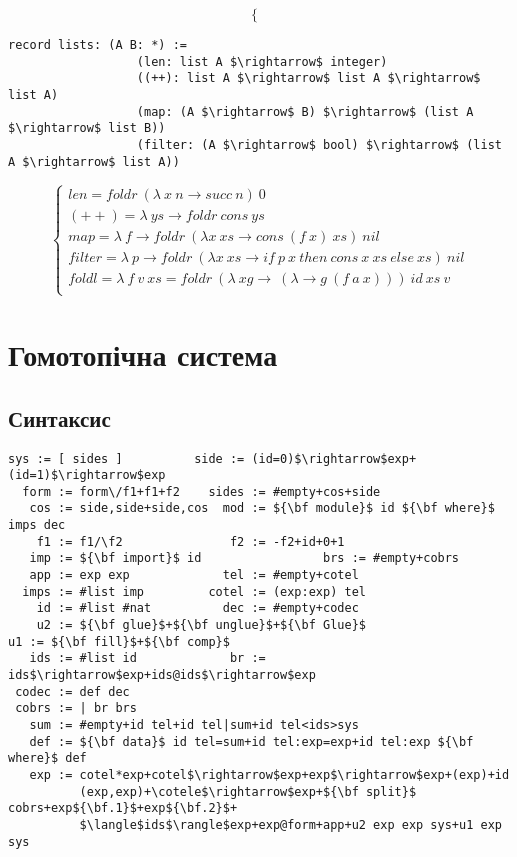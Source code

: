 \begin{definition}
\begin{definition}
\begin{definition}
\begin{definition}
$$\begin{cases}
\end{cases}
$$
\begin{lstlisting}[mathescape=true]
           record lists: (A B: *) :=
                  (len: list A $\rightarrow$ integer)
                  ((++): list A $\rightarrow$ list A $\rightarrow$ list A)
                  (map: (A $\rightarrow$ B) $\rightarrow$ (list A $\rightarrow$ list B))
                  (filter: (A $\rightarrow$ bool) $\rightarrow$ (list A $\rightarrow$ list A))
\end{lstlisting}
$$
\begin{cases}
len = foldr\ (\lambda\ x\ n \rightarrow succ\ n)\ 0\\
(++) = \lambda\ ys \rightarrow foldr\ cons\ ys\\
map = \lambda\ f \rightarrow foldr\ (\lambda x\ xs \rightarrow cons\ (f\ x)\ xs)\ nil\\
filter = \lambda\ p \rightarrow foldr\ (\lambda x\ xs \rightarrow if\ p\ x\ then\ cons\ x\ xs\ else\ xs)\ nil\\
foldl = \lambda\ f\ v\ xs = foldr\ (\lambda\ xg\rightarrow\ (\lambda \rightarrow g\ (f\ a\ x)))\ id\ xs\ v\\
\end{cases}
$$

\newpage
\section{Гомотопічна система}

\subsection{Синтаксис}


\begin{lstlisting}[mathescape=true]
   sys := [ sides ]          side := (id=0)$\rightarrow$exp+(id=1)$\rightarrow$exp
  form := form\/f1+f1+f2    sides := #empty+cos+side
   cos := side,side+side,cos  mod := ${\bf module}$ id ${\bf where}$ imps dec
    f1 := f1/\f2               f2 := -f2+id+0+1
   imp := ${\bf import}$ id                 brs := #empty+cobrs
   app := exp exp             tel := #empty+cotel
  imps := #list imp         cotel := (exp:exp) tel
    id := #list #nat          dec := #empty+codec
    u2 := ${\bf glue}$+${\bf unglue}$+${\bf Glue}$                   u1 := ${\bf fill}$+${\bf comp}$
   ids := #list id             br := ids$\rightarrow$exp+ids@ids$\rightarrow$exp
 codec := def dec
 cobrs := | br brs
   sum := #empty+id tel+id tel|sum+id tel<ids>sys   
   def := ${\bf data}$ id tel=sum+id tel:exp=exp+id tel:exp ${\bf where}$ def
   exp := cotel*exp+cotel$\rightarrow$exp+exp$\rightarrow$exp+(exp)+id
          (exp,exp)+\cotele$\rightarrow$exp+${\bf split}$ cobrs+exp${\bf.1}$+exp${\bf.2}$+
          $\langle$ids$\rangle$exp+exp@form+app+u2 exp exp sys+u1 exp sys
\end{lstlisting}


\end{definition}
\end{definition}
\end{definition}
\end{definition}
